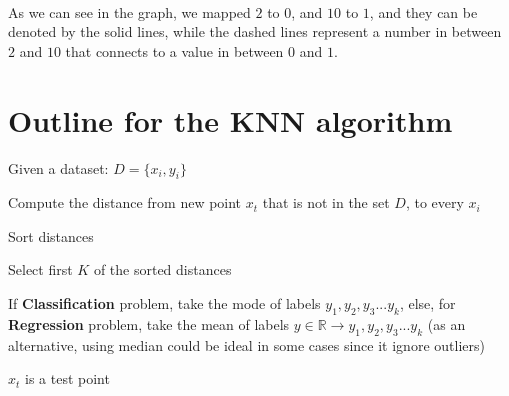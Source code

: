 \begin{outline}[enumerate]
\begin{center}
 \\
\end{center}

As we can see in the graph, we mapped $2$ to $0$, and $10$ to $1$, and they can be denoted by the solid lines,
while the dashed lines represent a number in between $2$ and $10$ that connects to a value in between $0$ and $1$.

\end{outline}


\section{Outline for the KNN algorithm}
\begin{outline}

    \1  Given a dataset: $D=\{x_i,y_i\}$

    \1  Compute the distance from new point $x_t$ that is not in the set $D$, to every $x_i$

    \1  Sort distances

    \1  Select first $K$ of the sorted distances

    \1  If \textbf{Classification} problem, take the mode of labels $y_1, y_2, y_3 ... y_k$, else, for \textbf{Regression}
        problem, take the mean of labels $y \in \mathbb{R} \rightarrow y_1, y_2, y_3 ... y_k$ (as an alternative, using median could be
        ideal in some cases since it ignore outliers)

\end{outline}

$x_t$ is a test point\\

